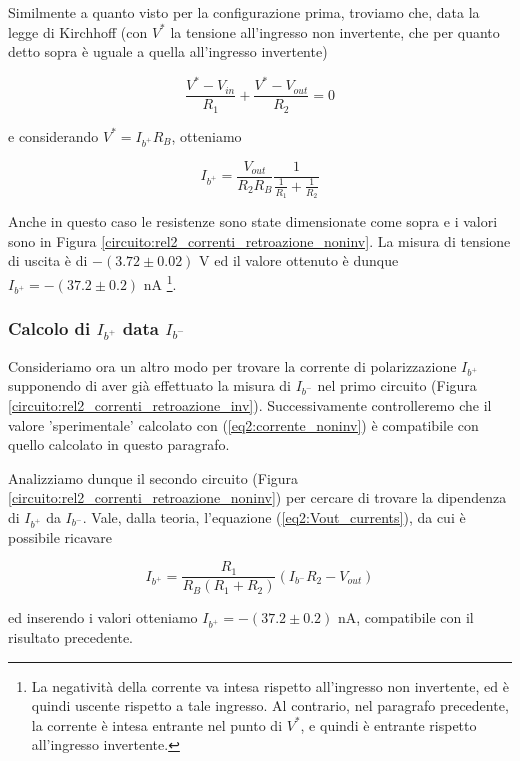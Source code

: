 Similmente a quanto visto per la configurazione prima, troviamo che, data la legge di Kirchhoff (con $V^*$ la tensione all'ingresso non invertente, che per quanto detto sopra è uguale a quella all'ingresso invertente)

$$\frac{V^* - V_{in}}{R_1} + \frac{V^*-V_{out}}{R_2}=0$$

e considerando $V^*=I_{b^+} R_B$, otteniamo

\begin{equation}
I_{b^+}=\frac{V_{out}}{R_2 R_B}\frac{1}{\frac{1}{R_1}+\frac{1}{R_2}}
\label{eq2:corrente_noninv}
\end{equation}

Anche in questo caso le resistenze sono state dimensionate come sopra e i valori sono in Figura \ref{circuito:rel2_correnti_retroazione_noninv}. La misura di tensione di uscita è di $-(3.72 \pm 0.02)$   \si{\volt} ed il valore ottenuto è dunque $I_{b^+} = - (37.2 \pm 0.2)$ \si{\nano\ampere} \footnote{La negatività della corrente va intesa rispetto all'ingresso non invertente, ed è quindi uscente rispetto a tale ingresso. Al contrario, nel paragrafo precedente, la corrente è intesa entrante nel punto di $V^*$, e quindi è entrante rispetto all'ingresso invertente.}.

\subsubsection*{Calcolo di $I_{b^+}$ data $I_{b^-}$}

Consideriamo ora un altro modo per trovare la corrente di polarizzazione $I_{b^+}$ supponendo di aver già effettuato la misura di $I_{b^-}$ nel primo circuito (Figura \ref{circuito:rel2_correnti_retroazione_inv}). Successivamente controlleremo che il valore 'sperimentale' calcolato con (\ref{eq2:corrente_noninv}) è compatibile con quello calcolato in questo paragrafo.

Analizziamo dunque il secondo circuito (Figura \ref{circuito:rel2_correnti_retroazione_noninv}) per cercare di trovare la dipendenza di $I_{b^+}$ da $I_{b^-}$. Vale, dalla teoria, l'equazione (\ref{eq2:Vout_currents}), da cui è possibile ricavare

$$I_{b^+} = \frac{R_1}{R_B(R_1+R_2)}(I_{b^-} R_2-V_{out})$$

ed inserendo i valori otteniamo $I_{b^+} = - (37.2 \pm 0.2)$ \si{\nano\ampere}, compatibile con il risultato precedente.


